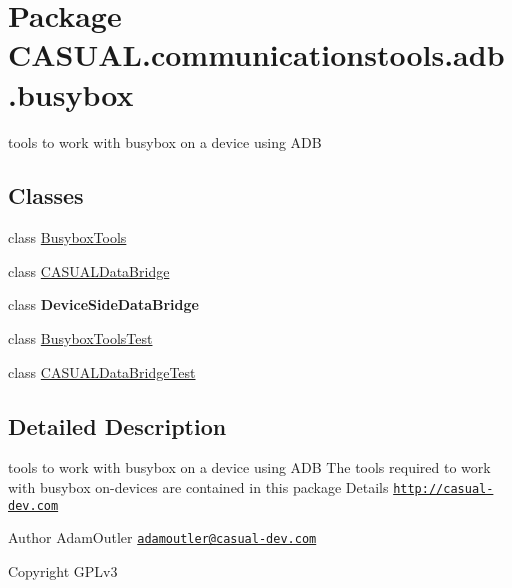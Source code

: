\hypertarget{namespace_c_a_s_u_a_l_1_1communicationstools_1_1adb_1_1busybox}{\section{Package C\-A\-S\-U\-A\-L.\-communicationstools.\-adb.\-busybox}
\label{namespace_c_a_s_u_a_l_1_1communicationstools_1_1adb_1_1busybox}
}


tools to work with busybox on a device using A\-D\-B  


\subsection*{Classes}
\begin{DoxyCompactItemize}
\item 
class \hyperlink{class_c_a_s_u_a_l_1_1communicationstools_1_1adb_1_1busybox_1_1_busybox_tools}{Busybox\-Tools}
\item 
class \hyperlink{class_c_a_s_u_a_l_1_1communicationstools_1_1adb_1_1busybox_1_1_c_a_s_u_a_l_data_bridge}{C\-A\-S\-U\-A\-L\-Data\-Bridge}
\item 
class {\bfseries Device\-Side\-Data\-Bridge}
\item 
class \hyperlink{class_c_a_s_u_a_l_1_1communicationstools_1_1adb_1_1busybox_1_1_busybox_tools_test}{Busybox\-Tools\-Test}
\item 
class \hyperlink{class_c_a_s_u_a_l_1_1communicationstools_1_1adb_1_1busybox_1_1_c_a_s_u_a_l_data_bridge_test}{C\-A\-S\-U\-A\-L\-Data\-Bridge\-Test}
\end{DoxyCompactItemize}


\subsection{Detailed Description}
tools to work with busybox on a device using A\-D\-B The tools required to work with busybox on-\/devices are contained in this package Details \href{http://casual-dev.com}{\tt http\-://casual-\/dev.\-com} \begin{DoxyAuthor}{Author}
Adam\-Outler \href{mailto:adamoutler@casual-dev.com}{\tt adamoutler@casual-\/dev.\-com} 
\end{DoxyAuthor}
\begin{DoxyCopyright}{Copyright}
G\-P\-Lv3 
\end{DoxyCopyright}
